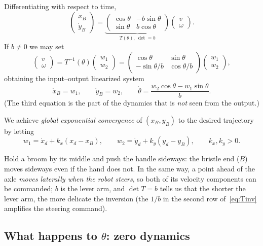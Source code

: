 \documentclass[11pt,a4paper]{article}
\def\bm#1{#1}%
\def\vect#1{#1}%
\newcommand{\vect}[1]{\bm{#1}}
\theoremstyle{definition}
\theoremstyle{plain}
\theoremstyle{remark}
\begin{document}
Differentiating with respect to time,
\[
\begin{pmatrix}\dot x_B\\\dot y_B\end{pmatrix}=\underbrace{\begin{pmatrix}\cos\theta&-b\sin\theta\\\sin\theta&b\cos\theta\end{pmatrix}}_{\vect T(\theta),\ \det=b}\begin{pmatrix}v\\\omega\end{pmatrix}.
\]
If $b\neq0$ we may set
\begin{equation}\label{eq:Tinv}
\begin{pmatrix}v\\\omega\end{pmatrix}=\vect T^{-1}(\theta)\begin{pmatrix}w_1\\w_2\end{pmatrix}=\begin{pmatrix}\cos\theta&\sin\theta\\-\sin\theta/b&\cos\theta/b\end{pmatrix}\begin{pmatrix}w_1\\w_2\end{pmatrix},
\end{equation}
obtaining the input--output linearized system
\[
\dot x_B=w_1,\qquad \dot y_B=w_2,\qquad \dot\theta=\frac{w_2\cos\theta-w_1\sin\theta}{b}.
\]
(The third equation is the part of the dynamics that is \emph{not} seen from the output.)

We achieve \emph{global exponential convergence} of $(x_B,y_B)$ to the desired trajectory by letting
\[
w_1=\dot x_d+k_x(x_d-x_B),\qquad w_2=\dot y_d+k_y(y_d-y_B),\qquad k_x,k_y>0 .
\]

\begin{intuition}
Hold a broom by its middle and push the handle sideways: the bristle end ($B$) moves sideways even if the hand does not. In the same way, a point ahead of the axle \emph{moves laterally when the robot steers}, so both of its velocity components can be commanded; $b$ is the lever arm, and $\det\vect T=b$ tells us that the shorter the lever arm, the more delicate the inversion (the $1/b$ in the second row of~\eqref{eq:Tinv} amplifies the steering command).
\end{intuition}

\subsection{What happens to $\theta$: zero dynamics}
\end{document}
